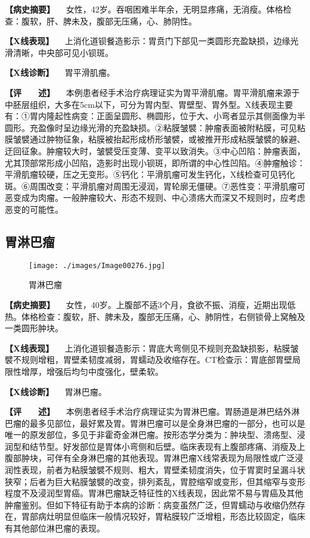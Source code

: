 \textbf{【病史摘要】}
　女性，42岁。吞咽困难半年余，无明显疼痛，无消瘦。体格检查：腹软，肝、脾未及，腹部无压痛，心、肺阴性。

\textbf{【X线表现】}
　上消化道钡餐造影示：胃贲门下部见一类圆形充盈缺损，边缘光滑清晰，中央部可见小钡斑。

\textbf{【X线诊断】} 　胃平滑肌瘤。

\textbf{【评　　述】}
　本例患者经手术治疗病理证实为胃平滑肌瘤。胃平滑肌瘤来源于中胚层组织，大多在5cm以下，可分为胃内型、胃壁型、胃外型。X线表现主要有：①胃内隆起性病变：正面呈圆形、椭圆形，位于大、小弯者显示其侧面像为半圆形。充盈像时呈边缘光滑的充盈缺损。②粘膜皱襞：肿瘤表面被附粘膜，可见粘膜皱襞通过肿物征象，粘膜被抬起形成桥形皱襞，或被推开形成粘膜皱襞的躲避、迂回征象。肿瘤较大时，皱襞受压变薄、变平以致消失。③中心凹陷：肿瘤表面，尤其顶部常形成小凹陷，造影时出现小钡斑，即所谓的中心性凹陷。④肿瘤触诊：平滑肌瘤较硬，压之无变形。⑤钙化：平滑肌瘤可发生钙化，X线检查可见钙化斑。⑥周围改变：平滑肌瘤对周围无浸润，胃轮廓无僵硬。⑦恶性变：平滑肌瘤可恶变成为肉瘤。一般肿瘤较大、形态不规则、中心溃疡大而深又不规则时，应考虑恶变的可能性。

\subsection{胃淋巴瘤}

\begin{figure}[!htbp]
 \centering
 \texttt{[image: ./images/Image00276.jpg]}
 \captionsetup{justification=centering}
 \caption{胃淋巴瘤}
 \label{fig5-3-14}
  \end{figure} 

\textbf{【病史摘要】}
　女性，40岁。上腹部不适3个月，食欲不振、消瘦，近期出现低热。体格检查：腹软，肝、脾未及，腹部无压痛，心、肺阴性，右侧锁骨上窝触及一类圆形肿块。

\textbf{【X线表现】}
　上消化道钡餐造影示：胃底大弯侧见不规则充盈缺损影，粘膜皱襞不规则增粗，胃壁柔韧度减弱，胃蠕动及收缩存在。CT检查示：胃底部胃壁局限性增厚，增强后均匀中度强化，壁柔软。

\textbf{【X线诊断】} 　胃淋巴瘤。

\textbf{【评　　述】}
　本例患者经手术治疗病理证实为胃淋巴瘤。胃肠道是淋巴结外淋巴瘤的最多见部位，最好累及胃。胃淋巴瘤可以是全身淋巴瘤的一部分，也可以是唯一的原发部位，多见于非霍奇金淋巴瘤。按形态学分类为：肿块型、溃疡型、浸润型和结节型。好发部位是胃体小弯侧和后壁。临床表现有上腹部疼痛、消瘦及上腹部肿块，可伴有全身淋巴瘤的其他表现。胃淋巴瘤X线常表现为局限性或广泛浸润性表现，前者为粘膜皱襞不规则、粗大，胃壁柔韧度消失，位于胃窦时呈漏斗状狭窄；后者为巨大粘膜皱襞的改变，排列紊乱，胃腔缩窄或变形，但其缩窄与变形程度不及浸润型胃癌。胃淋巴瘤缺乏特征性的X线表现，因此常不易与胃癌及其他肿瘤鉴别。但如下特征有助于本病的诊断：病变虽然广泛，但胃蠕动与收缩仍然存在，胃部病灶明显但临床一般情况较好，胃粘膜较广泛增粗，形态比较固定，临床有其他部位淋巴瘤的表现。

